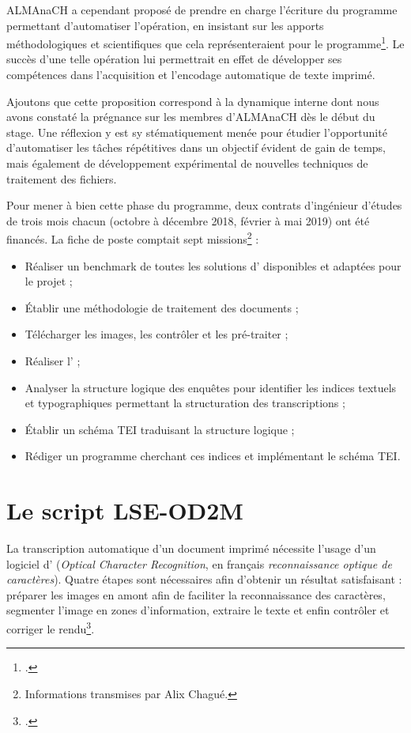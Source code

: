ALMAnaCH a cependant proposé de prendre en charge l'écriture du programme permettant d'automatiser l'opération, en insistant sur les apports méthodologiques et scientifiques que cela représenteraient pour le programme\footcite[p. 52]{chague}. Le succès d'une telle opération lui permettrait en effet de développer ses compétences dans l'acquisition et l'encodage automatique de texte imprimé.

Ajoutons que cette proposition correspond à la dynamique interne dont nous avons constaté la prégnance sur les membres d'ALMAnaCH dès le début du stage. Une réflexion y est sy
stématiquement menée pour étudier l'opportunité d'automatiser les tâches répétitives dans un objectif évident de gain de temps, mais également de développement expérimental de nouvelles techniques de traitement des fichiers.

Pour mener à bien cette phase du programme, deux contrats d'ingénieur d'études de trois mois chacun (octobre à décembre 2018, février à mai 2019) ont été financés. La fiche de poste comptait sept missions\footnote{Informations transmises par Alix Chagué.} :

\begin{itemize}
    \item Réaliser un benchmark de toutes les solutions d'\ocr{} disponibles et adaptées pour le projet ;
    \item Établir une méthodologie de traitement des documents ;
    \item Télécharger les images, les contrôler et les pré-traiter ;
    \item Réaliser l'\ocr{} ;
    \item Analyser la structure logique des enquêtes pour identifier les indices textuels et typographiques permettant la structuration des transcriptions ;
    \item Établir un schéma TEI traduisant la structure logique ;
    \item Rédiger un programme cherchant ces indices et implémentant le schéma TEI.
\end{itemize}

\section{Le script \textsc{LSE-OD2M}}

La transcription automatique d'un document imprimé nécessite l'usage d'un logiciel d'\ocr{} (\textit{Optical Character Recognition}, en français \textit{reconnaissance optique de caractères}). Quatre étapes sont nécessaires afin d'obtenir un résultat satisfaisant : préparer les images en amont afin de faciliter la reconnaissance des caractères, segmenter l'image en zones d'information, extraire le texte et enfin contrôler et corriger le rendu\footcite[p. 1]{karpinski}.

